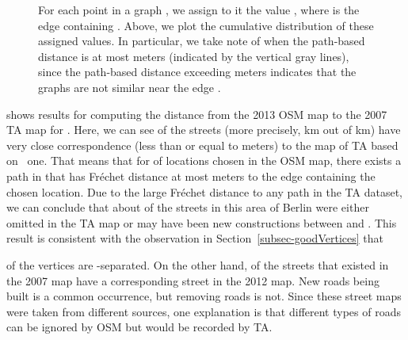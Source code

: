 \begin{figure}[tbph]
\centering {}



\caption{For each point  in a graph , we assign to it the value
, where  is the edge containing
  .  Above, we plot the cumulative distribution of these assigned values.
  In particular, we take note of when the path-based distance is at most 
  meters (indicated by the vertical gray lines),
  since the path-based distance exceeding  meters indicates that the graphs
  are not similar near the edge .}
\label{fig-percentilePB}
\end{figure}





 shows results for computing the distance from
the 2013 OSM map to the 2007 TA map for \bsmall.  Here, we can see  of the
streets (more precisely,  km out of
 km) have very close correspondence (less than or equal
 to  meters) to
the map of TA based on \length\ one.
That means that for  of  locations chosen in the OSM map, there exists a
path in  that has Fr\'echet distance 
at most  meters to the edge containing the chosen location.  Due to the 
large
Fr\'echet distance 
to any path in the TA
dataset, we can conclude that about  of the streets in this area of Berlin
were either omitted in the TA map or
may have been new constructions between  and .
This result is
consistent with the observation in Section~\ref{subsec-goodVertices} that
 
of the vertices are -separated.
On the other
hand,    of the streets that existed in the 2007 map have a
corresponding street in the 2012 map.  New
roads being built is a common 
occurrence, but removing roads is not.  Since these
street maps were taken from different sources, one explanation is that
different types of roads can be ignored by OSM
but would be recorded by TA.



